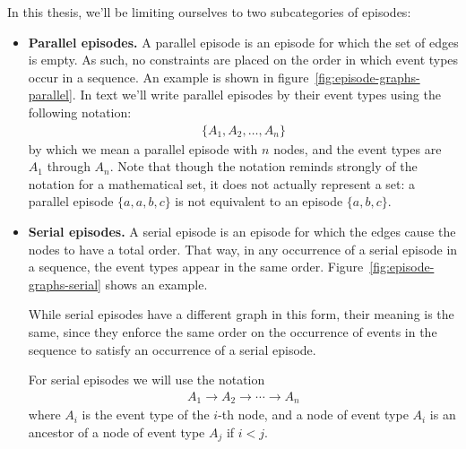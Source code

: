 In this thesis, we'll be limiting ourselves to two subcategories of episodes:
\begin{itemize}
\item \textbf{Parallel episodes.} A parallel episode is an episode for which the set of edges is empty. As such, no constraints are placed on the order in which event types occur in a sequence. An example is shown in figure~\ref{fig:episode-graphs-parallel}. In text we'll write parallel episodes by their event types using the following notation:
\begin{align*}
    \{ A_1, A_2, \ldots, A_n \}
\end{align*}
by which we mean a parallel episode with $ n $ nodes, and the event types are $ A_1 $ through $ A_n $. Note that though the notation reminds strongly of the notation for a mathematical set, it does not actually represent a set: a parallel episode $ \{ a, a, b, c \} $ is not equivalent to an episode $ \{ a, b, c \} $.

\item \textbf{Serial episodes.} A serial episode is an episode for which the edges cause the nodes to have a total order. That way, in any occurrence of a serial episode in a sequence, the event types appear in the same order. Figure~\ref{fig:episode-graphs-serial} shows an example.


While serial episodes have a different graph in this form, their meaning is the same, since they enforce the same order on the occurrence of events in the sequence to satisfy an occurrence of a serial episode.

For serial episodes we will use the notation
\begin{align*}
    A_1 \to A_2 \to \cdots \to A_n
\end{align*}
where $ A_i $ is the event type of the $ i $-th node, and a node of event type $ A_i $ is an ancestor of a node of event type $ A_j $ if $ i < j $.

\end{itemize}

